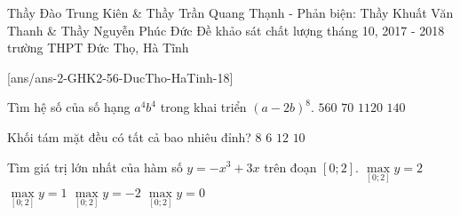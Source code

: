 
\begin{name}
{Thầy Đào Trung Kiên \& Thầy Trần Quang Thạnh - Phản biện: Thầy Khuất Văn Thanh \& Thầy Nguyễn Phúc Đức}
{Đề khảo sát chất lượng tháng 10, 2017 - 2018 trường THPT Đức Thọ, Hà Tĩnh}
\end{name}
\setcounter{ex}{0}\setcounter{bt}{0}
[ans/ans-2-GHK2-56-DucTho-HaTinh-18]
\begin{ex}%
	Tìm hệ số của số hạng $a^4b^4$ trong khai triển $(a-2b)^8$.
	\choice
	{$560 $}
	{$70 $}
	{\True  $1120 $}
	{$140 $}
\end{ex}

\begin{ex}%
	Khối tám mặt đều có tất cả bao nhiêu đỉnh?
	\choice
	{$8 $}
	{\True $6 $}
	{$12 $}
	{$10 $}
\end{ex}

\begin{ex}%
	Tìm giá trị lớn nhất của hàm số $y=-x^3+3x$ trên đoạn $[0;2]$.
	\choice
	{\True $\max\limits_{[0;2]}y=2 $}
	{$\max\limits_{[0;2]}y=1 $}
	{$\max\limits_{[0;2]}y=-2 $}
	{$\max\limits_{[0;2]}y=0 $}
\end{ex}

